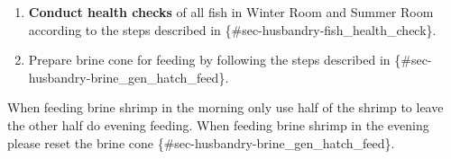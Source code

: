 \documentclass[
  letterpaper,
  DIV=11,
  numbers=noendperiod]{scrreprt}
\begin{document}
\begin{enumerate}
\def\labelenumi{\arabic{enumi}.}
\item
  \textbf{Conduct health checks} of all fish in Winter Room and Summer
  Room according to the steps described in
  \{\#sec-husbandry-fish\_health\_check\}.
\item
  Prepare brine cone for feeding by following the steps described in
  \{\#sec-husbandry-brine\_gen\_hatch\_feed\}.
\end{enumerate}

\begin{tcolorbox}[enhanced jigsaw, bottomtitle=1mm, rightrule=.15mm, toptitle=1mm, opacitybacktitle=0.6, bottomrule=.15mm, titlerule=0mm, coltitle=black, leftrule=.75mm, arc=.35mm, colback=white, colframe=quarto-callout-warning-color-frame, left=2mm, colbacktitle=quarto-callout-warning-color!10!white, title=\textcolor{quarto-callout-warning-color}{\faExclamationTriangle}\hspace{0.5em}{NOTES}, toprule=.15mm, opacityback=0, breakable]

When feeding brine shrimp in the morning only use half of the shrimp to
leave the other half do evening feeding. When feeding brine shrimp in
the evening please reset the brine cone
\{\#sec-husbandry-brine\_gen\_hatch\_feed\}.

\end{tcolorbox}
\end{document}
